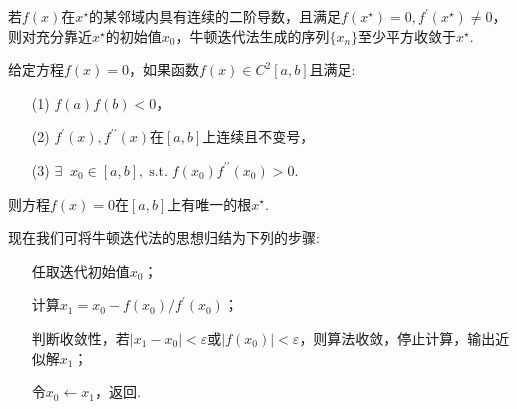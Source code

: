 \documentclass[cn,12pt,founder,a4paper]{elegantpaper}
\newcommand*{\exist}{\exists\mathop{}\!}
\newcommand*{\douprime}{{\prime\prime}}
\renewcommand*{\emph}[1]{{\heiti{#1}}}
\DeclareMathOperator*{\st}{s.t.}
\begin{document}
\begin{theorem}\label{th:1}
  若\(f(x)\)在\(x^\star\)的某邻域内具有连续的二阶导数，且满足\(f(x^\star)=0,f^\prime(x^\star)\ne 0\)，则对充分靠近\(x^\star\)的初始值\(x_0\)，牛顿迭代法生成的序列\(\lbrace x_n\rbrace\)至少平方收敛于\(x^\star\).
\end{theorem}
\begin{theorem}[非局部收敛定理]\label{th:2}
  给定方程\(f(x)=0\)，如果函数\(f(x)\in C^2[a,b]\)且满足:
  \begin{enumerate}
    \item[(1)] \(f(a)f(b)<0\)，
    \item[(2)] \(f^\prime(x),f^\douprime(x)\)在\([a,b]\)上连续且不变号，
    \item[(3)] \(\exist x_0\in[a,b],\st f(x_0)f^\douprime(x_0)>0\).   
  \end{enumerate}
  则方程\(f(x)=0\)在\([a,b]\)上有唯一的根\(x^\star\).
\end{theorem}
现在我们可将牛顿迭代法的思想归结为下列的步骤:
\begin{enumerate}
  \item[\emph{步一}] 任取迭代初始值\(x_0\)；
  \item[\emph{步二}] 计算\(x_1=x_0-{f(x_0)}/{f^\prime(x_0)}\)；
  \item[\emph{步三}] 判断收敛性，若\(\vert x_1-x_0\vert<\varepsilon\)或\(\vert f(x_0)\vert<\varepsilon\)，则算法收敛，停止计算，输出近似解\(x_1\)；
  \item[\emph{步四}] 令\(x_0\leftarrow x_1\)，返回\emph{步二}.   
\end{enumerate}
\end{document}
